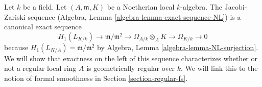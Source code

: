 \noindent
Let $k$ be a field. Let $(A, \mathfrak m, K)$ be a Noetherian local
$k$-algebra. The Jacobi-Zariski sequence
(Algebra, Lemma \ref{algebra-lemma-exact-sequence-NL})
is a canonical exact sequence
$$
H_1(L_{K/k}) \to \mathfrak m/\mathfrak m^2 \to \Omega_{A/k} \otimes_A K \to
\Omega_{K/k} \to 0
$$
because $H_1(L_{K/A}) = \mathfrak m/\mathfrak m^2$ by
Algebra, Lemma \ref{algebra-lemma-NL-surjection}.
We will show that exactness on the left of this sequence characterizes
whether or not a regular local ring $A$ is geometrically regular over $k$.
We will link this to the notion of formal smoothness in
Section \ref{section-regular-fs}.
